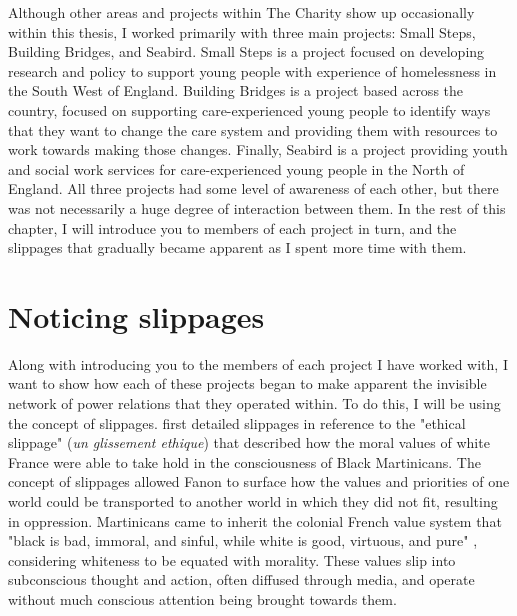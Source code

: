 Although other areas and projects within The Charity show up occasionally within this thesis, I  worked primarily with three main projects: Small Steps, Building Bridges, and Seabird. Small Steps is a project focused on developing research and policy to support young people with experience of homelessness in the South West of England. Building Bridges is a project based across the country, focused on supporting care-experienced young people to identify ways that they want to change the care system and providing them with resources to work towards making those changes. Finally, Seabird is a project providing youth and social work services for care-experienced young people in the North of England. All three projects had some level of awareness of each other, but there was not necessarily a huge degree of interaction between them. In the rest of this chapter, I will introduce you to members of each project in turn, and the slippages that gradually became apparent as I spent more time with them. 

\section{Noticing slippages}

Along with introducing you to the members of each project I have worked with, I want to show how each of these projects began to make apparent the invisible network of power relations that they operated within. To do this, I will be using the concept of slippages. \citet{fanon_black_1986} first detailed slippages in reference to the "ethical slippage" (\textit{un glissement ethique}) that described how the moral values of white France were able to take hold in the consciousness of Black Martinicans. The concept of slippages allowed Fanon to surface how the values and priorities of one world could be transported to another world in which they did not fit, resulting in oppression. Martinicans came to inherit the colonial French value system that "black is bad, immoral, and sinful, while white is good, virtuous, and pure" \citep[11]{sullivan_ethical_2004}, considering whiteness to be equated with morality. These values slip into subconscious thought and action, often diffused through media, and operate without much conscious attention being brought towards them. 

